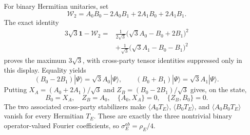 \documentclass[11pt]{article}
\theoremstyle{remark}
\newcommand{\Id}{\mathbf 1}
\begin{document}
For binary Hermitian unitaries, set
\[
\mathcal W_2
=A_0B_0-2A_0B_1+2A_1B_0+2A_1B_1.
\]
The exact identity
\[
\begin{aligned}
3\sqrt3\Id-\mathcal W_2
={}&
\frac1{2\sqrt3}
\bigl(\sqrt3 A_0-B_0+2B_1\bigr)^2\\
&+
\frac1{\sqrt3}
\bigl(\sqrt3 A_1-B_0-B_1\bigr)^2
\end{aligned}
\]
proves the maximum \(3\sqrt3\), with cross-party tensor identities
suppressed only in this display.  Equality yields
\[
(B_0-2B_1)|\Psi\rangle=\sqrt3A_0|\Psi\rangle,
\qquad
(B_0+B_1)|\Psi\rangle=\sqrt3A_1|\Psi\rangle.
\]
Putting \(X_A=(A_0+2A_1)/\sqrt3\) and
\(Z_B=(B_0-2B_1)/\sqrt3\) gives, on the state,
\[
B_0=X_A,\quad Z_B=A_0,\quad
\{A_0,X_A\}=0,\quad\{Z_B,B_0\}=0.
\]
The two associated cross-party stabilizers make
\(\langle A_0T_E\rangle\),
\(\langle B_0T_E\rangle\), and
\(\langle A_0B_0T_E\rangle\) vanish for every Hermitian \(T_E\).
These are exactly the three nontrivial binary operator-valued Fourier
coefficients, so \(\sigma_E^{ab}=\rho_E/4\).
\end{document}
